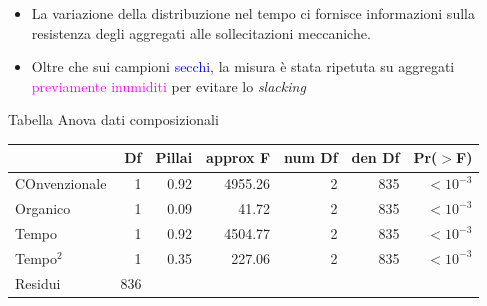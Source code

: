 \documentclass[10pt]{beamer}
\begin{document}
\begin{frame}
  \footnotesize
  \begin{itemize}
  \item La variazione della distribuzione nel tempo ci fornisce
    informazioni sulla resistenza degli aggregati alle sollecitazioni
    meccaniche.
  \item Oltre che sui campioni \textcolor{blue}{secchi}, la misura
    \`e stata ripetuta su aggregati 
    \textcolor{magenta}{previamente inumiditi} per evitare lo \textit{slacking}
  \end{itemize}
\end{frame}


\begin{frame}{Tabella Anova dati composizionali}
  \footnotesize
  \begin{table}
    \centering
    \begin{tabular}{lrrrrrr}
      \hline
      & Df & Pillai & approx F & num Df & den Df & Pr($>$F) \\ 
      \hline
      COnvenzionale & 1 & 0.92 & 4955.26 & 2 & 835 & $<10^{-3}$ \\ 
      Organico  & 1 & 0.09 & 41.72 & 2 & 835 &  $<10^{-3}$ \\ 
      Tempo & 1 & 0.92 & 4504.77 & 2 & 835 &  $<10^{-3}$  \\ 
      Tempo$^2$& 1 & 0.35 & 227.06 & 2 & 835 &  $<10^{-3}$ \\ 
      Residui & 836 &  &  &  &  &  \\ 
      \hline
    \end{tabular}
  \end{table}
\end{frame}




\end{document}
